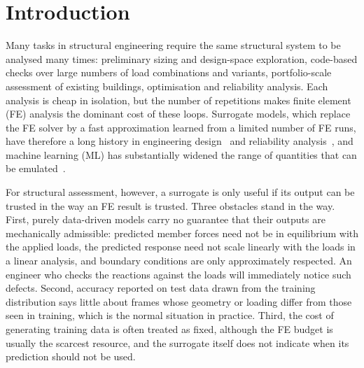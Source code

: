 \section{Introduction}\label{sec:intro}

Many tasks in structural engineering require the same structural system to be analysed many times: preliminary sizing and design-space exploration, code-based checks over large numbers of load combinations and variants, portfolio-scale assessment of existing buildings, optimisation and reliability analysis. Each analysis is cheap in isolation, but the number of repetitions makes finite element (FE) analysis the dominant cost of these loops. Surrogate models, which replace the FE solver by a fast approximation learned from a limited number of FE runs, have therefore a long history in engineering design~\cite{forrester2008surrogate} and reliability analysis~\cite{bichon2008egra,echard2011akmcs}, and machine learning (ML) has substantially widened the range of quantities that can be emulated~\cite{xie2020eqml}.

For structural assessment, however, a surrogate is only useful if its output can be trusted in the way an FE result is trusted. Three obstacles stand in the way. First, purely data-driven models carry no guarantee that their outputs are mechanically admissible: predicted member forces need not be in equilibrium with the applied loads, the predicted response need not scale linearly with the loads in a linear analysis, and boundary conditions are only approximately respected. An engineer who checks the reactions against the loads will immediately notice such defects. Second, accuracy reported on test data drawn from the training distribution says little about frames whose geometry or loading differ from those seen in training, which is the normal situation in practice. Third, the cost of generating training data is often treated as fixed, although the FE budget is usually the scarcest resource, and the surrogate itself does not indicate when its prediction should not be used.

